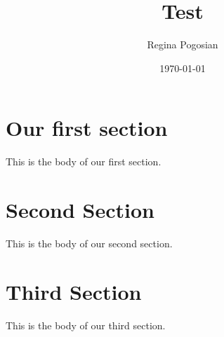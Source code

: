 \message{ !name(tex_test.tex)}\documentclass{article}
\title{Test}
\author{Regina Pogosian}
\date{\today}
\begin{document}


\section{Our first section}
This is the body of our first section.
\section{Second Section}
This is the body of our second section.
\section{Third Section}
This is the body of our third section.
\end{document}

